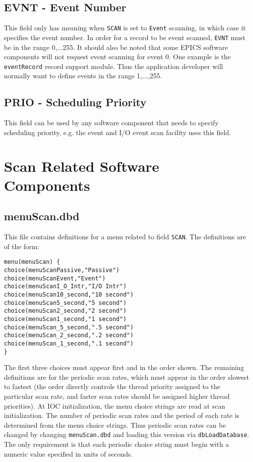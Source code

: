 \subsection{EVNT - Event Number}

This field only has meaning when \verb|SCAN| is set to \verb|Event| scanning, in which case it specifies the event number. In order 
for a record to be event scanned, \verb|EVNT| must be in the range 0,...255. It should also be noted that some EPICS software 
components will not request event scanning for event 0. One example is the \verb|eventRecord| record support module. Thus 
the application developer will normally want to define events in the range 1,...,255. 

\subsection{PRIO - Scheduling Priority }

This field can be used by any software component that needs to specify scheduling priority, e.g. the event and I/O event 
scan facility uses this field. 

\section{ Scan Related Software Components }

\subsection{menuScan.dbd}

This file contains definitions for a menu related to field \verb|SCAN|. The definitions are of the form:

\begin{verbatim}menu(menuScan) {
choice(menuScanPassive,"Passive")
choice(menuScanEvent,"Event")
choice(menuScanI_O_Intr,"I/O Intr")
choice(menuScan10_second,"10 second")
choice(menuScan5_second,"5 second")
choice(menuScan2_second,"2 second")
choice(menuScan1_second,"1 second")
choice(menuScan_5_second,".5 second")
choice(menuScan_2_second,".2 second")
choice(menuScan_1_second,".1 second")
}
\end{verbatim}The first three choices must appear first and in the order shown. The remaining definitions are for the periodic scan rates, 
which must appear in the order slowest to fastest (the order directly controls the thread priority assigned to the particular 
scan rate, and faster scan rates should be assigned higher thread priorities). At IOC initialization, the menu choice strings 
are read at scan initialization. The number of periodic scan rates and the period of each rate is determined from the menu 
choice strings. Thus periodic scan rates can be changed by changing \verb|menuScan.dbd| and loading this version via 
\verb|dbLoadDatabase|. The only requirement is that each periodic choice string must begin with a numeric value specified 
in units of seconds.

